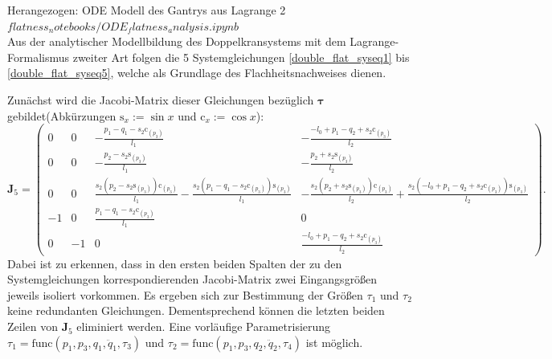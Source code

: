 Herangezogen: ODE Modell des Gantrys aus Lagrange 2 \\ $flatness_notebooks/ODE_flatness_analysis.ipynb$ \\
Aus der analytischer Modellbildung des Doppelkransystems mit dem Lagrange-Formalismus zweiter Art folgen die 5 Systemgleichungen \eqref{double_flat_syseq1} bis \eqref{double_flat_syseq5}, welche als Grundlage des Flachheitsnachweises dienen. 

Zunächst wird die Jacobi-Matrix dieser Gleichungen bezüglich $\boldsymbol{\tau}$ gebildet(Abkürzungen $\mathrm{s}_x := \sin{x}$ und $\mathrm{c}_x := \cos{x}$):
\begin{equation*}
	\mathbf{J}_5 = 
	\left(\begin{smallmatrix}
	0 & 0 & - \frac{p_{1} - q_{1} - s_{2} \mathrm{c}_{\left(p_{3} \right)}}{l_{1}} & - \frac{- l_{0} + p_{1} - q_{2} + s_{2} \mathrm{c}_{\left(p_{3} \right)}}{l_{2}}\\
	0 & 0 & - \frac{p_{2} - s_{2} \mathrm{s}_{\left(p_{3} \right)}}{l_{1}} & - \frac{p_{2} + s_{2} \mathrm{s}_{\left(p_{3} \right)}}{l_{2}}\\
	0 & 0 & \frac{s_{2} \left(p_{2} - s_{2} \mathrm{s}_{\left(p_{3} \right)}\right) \mathrm{c}_{\left(p_{3} \right)}}{l_{1}} - \frac{s_{2} \left(p_{1} - q_{1} - s_{2} \mathrm{c}_{\left(p_{3} \right)}\right) \mathrm{s}_{\left(p_{3} \right)}}{l_{1}} & - \frac{s_{2} \left(p_{2} + s_{2} \mathrm{s}_{\left(p_{3} \right)}\right) \mathrm{c}_{\left(p_{3} \right)}}{l_{2}} + \frac{s_{2} \left(- l_{0} + p_{1} - q_{2} + s_{2} \mathrm{c}_{\left(p_{3} \right)}\right) \mathrm{s}_{\left(p_{3} \right)}}{l_{2}}\\
	-1 & 0 & \frac{p_{1} - q_{1} - s_{2} \mathrm{c}_{\left(p_{3} \right)}}{l_{1}} & 0\\
	0 & -1 & 0 & \frac{- l_{0} + p_{1} - q_{2} + s_{2} \mathrm{c}_{\left(p_{3} \right)}}{l_{2}}
	\end{smallmatrix}\right).
\end{equation*}
Dabei ist zu erkennen, dass in den ersten beiden Spalten der zu den Systemgleichungen korrespondierenden Jacobi-Matrix zwei Eingangsgrößen jeweils isoliert vorkommen. Es ergeben sich zur Bestimmung der Größen $\tau_1$ und $\tau_2$ keine redundanten Gleichungen. Dementsprechend können die letzten beiden Zeilen von $\mathbf{J}_5$ eliminiert werden. Eine vorläufige Parametrisierung $\tau_1 = \mathrm{func}(p_1, p_3, q_1, \ddot{q}_1, \tau_3)$ und $\tau_2 = \mathrm{func}(p_1, p_3, q_2, \ddot{q}_2, \tau_4)$ ist möglich.

